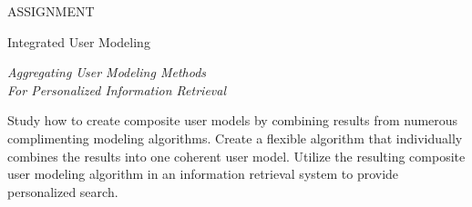 \null\vspace{6em}

{
  \centering
  \color{gray}
  ASSIGNMENT
  \color{black}
  \vspace{1em}
  
  \LARGE{Integrated User Modeling}\\
  \vspace{1em}
  
  \itshape
  \large{Aggregating User Modeling Methods}\\
  \large{For Personalized Information Retrieval}\\
}

\vspace{3em}

Study how to create composite user models by combining results
from numerous complimenting modeling algorithms. Create a flexible 
algorithm that individually combines the results into one coherent user model.
Utilize the resulting composite user modeling algorithm in an
information retrieval system to provide personalized search.

\vfill

